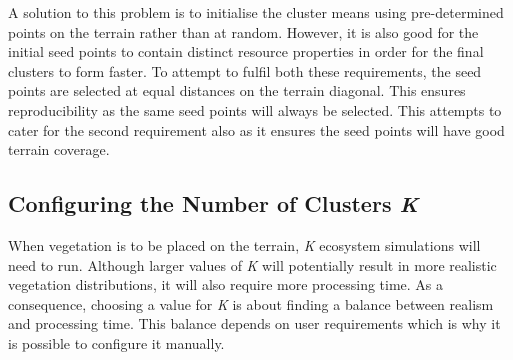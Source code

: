 A solution to this problem is to initialise the cluster means using pre-determined points on the terrain rather than at random. However, it is also good for the initial seed points to contain distinct resource properties in order for the final clusters to form faster. To attempt to fulfil both these requirements, the seed points are selected at equal distances on the terrain diagonal. This ensures reproducibility as the same seed points will always be selected. This attempts to cater for the second requirement also as it ensures the seed points will have good terrain coverage.

\subsection{Configuring the Number of Clusters \textit{K}}

When vegetation is to be placed on the terrain, \textit{K} ecosystem simulations will need to run. Although larger values of \textit{K} will potentially result in more realistic vegetation distributions, it will also require more processing time. As a consequence, choosing a value for \textit{K} is about finding a balance between realism and processing time. This balance depends on user requirements which is why it is possible to configure it manually. 
